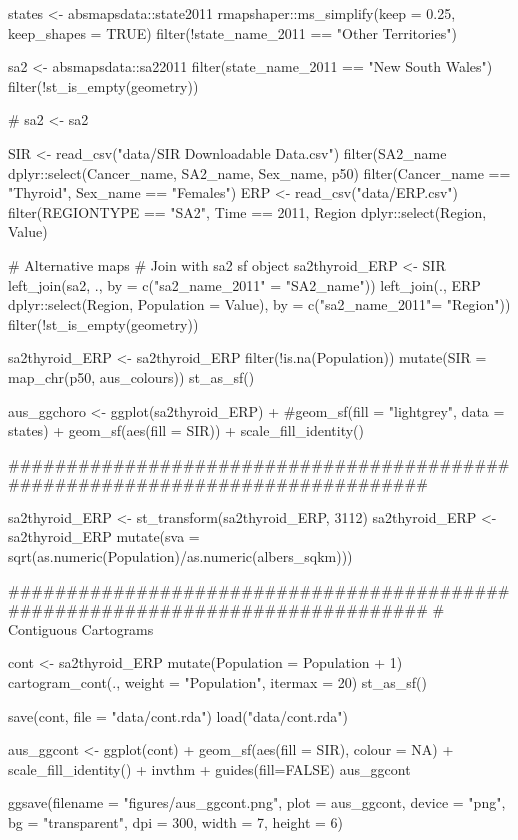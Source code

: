 \begin{Schunk}
\begin{Sinput}
states <- absmapsdata::state2011 %
  rmapshaper::ms_simplify(keep = 0.25, keep_shapes = TRUE) %
  filter(!state_name_2011 == "Other Territories")

sa2 <- absmapsdata::sa22011 %
  filter(state_name_2011 == "New South Wales") %
  filter(!st_is_empty(geometry))

# sa2 <- sa2 %

SIR <- read_csv("data/SIR Downloadable Data.csv") %
  filter(SA2_name %
  dplyr::select(Cancer_name, SA2_name, Sex_name, p50) %
  filter(Cancer_name == "Thyroid", Sex_name == "Females")
ERP <- read_csv("data/ERP.csv") %
  filter(REGIONTYPE == "SA2", Time == 2011, Region %
  dplyr::select(Region, Value)

# Alternative maps
# Join with sa2 sf object
sa2thyroid_ERP <- SIR %
  left_join(sa2, ., by = c("sa2_name_2011" = "SA2_name")) %
  left_join(., ERP %
              dplyr::select(Region, 
              Population = Value), by = c("sa2_name_2011"= "Region")) %
  filter(!st_is_empty(geometry))

sa2thyroid_ERP <- sa2thyroid_ERP %
  filter(!is.na(Population)) %
  mutate(SIR = map_chr(p50, aus_colours)) %
  st_as_sf() 

aus_ggchoro <- ggplot(sa2thyroid_ERP) + 
  #geom_sf(fill = "lightgrey", data = states) + 
  geom_sf(aes(fill = SIR)) + 
  scale_fill_identity()
\end{Sinput}
\end{Schunk}

\begin{Schunk}
\begin{Sinput}
###############################################################################

sa2thyroid_ERP <- st_transform(sa2thyroid_ERP, 3112)
sa2thyroid_ERP <- sa2thyroid_ERP %
  mutate(sva = sqrt(as.numeric(Population)/as.numeric(albers_sqkm)))


###############################################################################
# Contiguous Cartograms

cont <- sa2thyroid_ERP %
  mutate(Population = Population + 1) %
  cartogram_cont(., weight = "Population", itermax = 20) %
  st_as_sf()

save(cont, file = "data/cont.rda")
load("data/cont.rda")

aus_ggcont <- ggplot(cont) + 
  geom_sf(aes(fill = SIR), colour = NA) + 
  scale_fill_identity() + 
  invthm + guides(fill=FALSE)
aus_ggcont

ggsave(filename = "figures/aus_ggcont.png", plot = aus_ggcont,
       device = "png", bg = "transparent", dpi = 300,  width = 7, height = 6)
\end{Sinput}
\end{Schunk}

